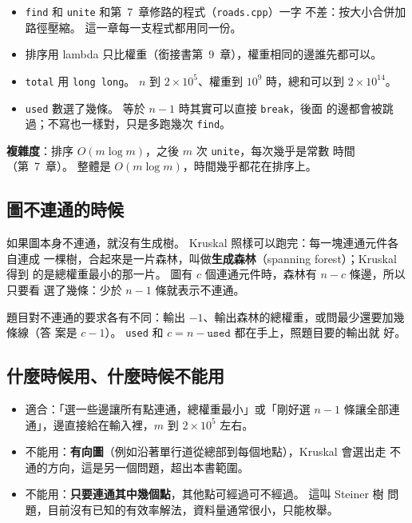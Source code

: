 \begin{itemize}
\item \texttt{find} 和 \texttt{unite} 和第~7~章修路的程式（\texttt{roads.cpp}）一字
不差：按大小合併加路徑壓縮。 這一章每一支程式都用同一份。
\item 排序用 lambda 只比權重（銜接書第~9~章），權重相同的邊誰先都可以。
\item \texttt{total} 用 \texttt{long long}。 $n$ 到 $2 \times 10^5$、權重到
$10^9$ 時，總和可以到 $2 \times 10^{14}$。
\item \texttt{used} 數選了幾條。 等於 $n - 1$ 時其實可以直接 \texttt{break}，後面
的邊都會被跳過；不寫也一樣對，只是多跑幾次 \texttt{find}。
\end{itemize}

\textbf{複雜度}：排序 $O(m \log m)$，之後 $m$ 次 \texttt{unite}，每次幾乎是常數
時間（第~7~章）。 整體是 $O(m \log m)$，時間幾乎都花在排序上。

\subsection{圖不連通的時候}
\label{sec:mst-forest}

如果圖本身不連通，就沒有生成樹。 Kruskal 照樣可以跑完：每一塊連通元件各自連成
一棵樹，合起來是一片森林，叫做\textbf{生成森林}（spanning forest）；Kruskal 得到
的是總權重最小的那一片。 圖有 $c$ 個連通元件時，森林有 $n - c$ 條邊，所以只要看
選了幾條：少於 $n - 1$ 條就表示不連通。

題目對不連通的要求各有不同：輸出 $-1$、輸出森林的總權重，或問最少還要加幾條線（答
案是 $c - 1$）。 \texttt{used} 和 $c = n - \texttt{used}$ 都在手上，照題目要的輸出就
好。

\subsection{什麼時候用、什麼時候不能用}

\begin{itemize}
\item 適合：「選一些邊讓所有點連通，總權重最小」或「剛好選 $n - 1$ 條讓全部連
通」，邊直接給在輸入裡，$m$ 到 $2 \times 10^5$ 左右。
\item 不能用：\textbf{有向圖}（例如沿著單行道從總部到每個地點），Kruskal 會選出走
不通的方向，這是另一個問題，超出本書範圍。
\item 不能用：\textbf{只要連通其中幾個點}，其他點可經過可不經過。 這叫 Steiner 樹
問題，目前沒有已知的有效率解法，資料量通常很小，只能枚舉。
\end{itemize}

